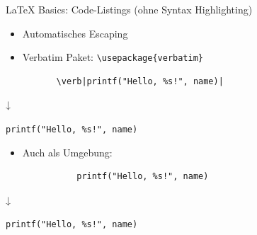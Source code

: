 \documentclass[main.tex]{subfiles}
\begin{document}
\begin{frame}[fragile]{\LaTeX{} Basics: Code-Listings (ohne Syntax Highlighting)}
    \begin{itemize}
        \item Automatisches Escaping
        \pause
        \item Verbatim Paket: \verb|\usepackage{verbatim}|
    \end{itemize}
    \pause
    \vspace{-10pt}
    \begin{center}
        \begin{verbatim}
          \verb|printf("Hello, %s!", name)|
        \end{verbatim}
        \vspace{-17pt}
        ↓

        \verb|printf("Hello, %s!", name)|
    \end{center}
    \pause
    \vspace{-7pt}
    \begin{itemize}
        \item Auch als Umgebung:
    \end{itemize}
    \pause
    \vspace{-10pt}
    \begin{center}
        \begin{metaverbatim}
            \begin{verbatim}
              printf("Hello, %s!", name)
            \end{verbatim}
        \end{metaverbatim}
        \vspace{-30pt}
        ↓

        \verb|printf("Hello, %s!", name)|
    \end{center}
\end{frame}
\end{document}

